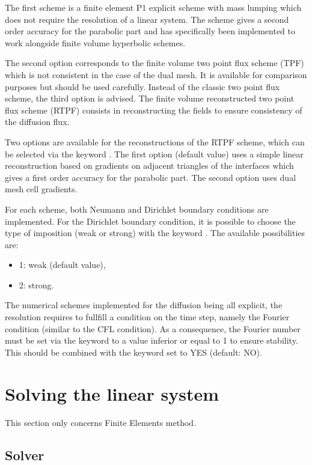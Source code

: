 The first scheme is a finite element P1 explicit scheme with mass lumping which
does not require the resolution of a linear system.
The scheme gives a second order accuracy for the parabolic part and
has specifically been implemented to work alongside finite volume
hyperbolic schemes.

The second option corresponds to the finite volume two point flux scheme (TPF)
which is not consistent in the case of the  dual mesh.
It is available for comparison purposes but should be used carefully.
Instead of the classic two point flux scheme, the third option is advised.
The finite volume reconstructed two point flux scheme (RTPF) consists in
reconstructing the fields to ensure consistency of the diffusion flux.

Two options are available for the reconstructions of the RTPF scheme, which 
can be selected via the keyword .
The first option (default value) uses a simple linear reconstruction
based on gradients on adjacent triangles of the interfaces which gives a
first order accuracy for the parabolic part. The second option uses dual mesh
cell gradients.

For each scheme, both Neumann and Dirichlet boundary conditions are implemented.
For the Dirichlet boundary condition, it is possible to choose the type of
imposition (weak or strong) with the keyword
.
The available possibilities are:
\begin{itemize}
\item 1: weak (default value),
\item 2: strong.
\end{itemize}

The numerical schemes implemented for the diffusion being all explicit,
the resolution requires to fullfill a condition on the time step, namely
the Fourier condition (similar to the CFL condition).
As a consequence, the Fourier number must be set
via the keyword 
to a value inferior or equal to 1 to ensure stability.
This should be combined with the keyword 
set to YES (default: NO).

\section{Solving the linear system}

This section only concerns Finite Elements method.
\subsection{Solver}

